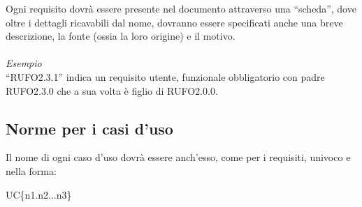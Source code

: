 Ogni requisito dovrà essere presente nel documento attraverso una ``scheda'', dove oltre i dettagli ricavabili dal nome, dovranno essere specificati anche una breve descrizione, la fonte (ossia la loro origine) e il motivo.\\\\
\textit{Esempio}\\
``RUFO2.3.1'' indica un requisito utente, funzionale obbligatorio con padre RUFO2.3.0 che a sua volta è figlio di RUFO2.0.0.

\subsection{Norme per i casi d'uso}
Il nome di ogni caso d'uso dovrà essere anch'esso, come per i requisiti, univoco e nella forma:
\begin{center}
UC\{n1.n2...n3\}
\end{center}
